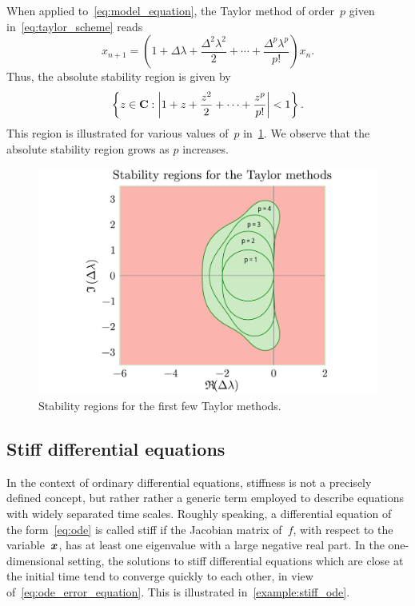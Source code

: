 \begin{example}
    When applied to~\eqref{eq:model_equation},
    the Taylor method of order~$p$ given in~\eqref{eq:taylor_scheme} reads
    \[
        x_{n+1} = \left(1 + \Delta \lambda + \frac{\Delta^2 \lambda^2}{2} + \dotsb + \frac{\Delta^p \lambda^p}{p!} \right) x_n.
    \]
    Thus, the absolute stability region is given by
    \[
        \left\{ z \in \mathbf C : \left\lvert 1 + z + \frac{z^2}{2} + \dotsb + \frac{z^p}{p!} \right\rvert < 1 \right\}.
    \]
    This region is illustrated for various values of~$p$ in~\cref{fig:stab_taylor}.
    We observe that the absolute stability region grows as $p$ increases.
\end{example}

\begin{figure}[ht]
    \centering
    \includegraphics[width=0.70\linewidth]{figures/stability_Taylor_methods.pdf}
    \caption{Stability regions for the first few Taylor methods.}%
    \label{fig:stab_taylor}
\end{figure}

\subsection*{Stiff differential equations}
In the context of ordinary differential equations,
stiffness is not a precisely defined concept,
but rather rather a generic term employed to describe equations with widely separated time scales.
Roughly speaking, a differential equation of the form~\eqref{eq:ode} is called stiff if the Jacobian matrix of~$f$,
with respect to the variable~$\mathbf{\boldsymbol{x}}$,
has at least one eigenvalue with a large negative real part.
In the one-dimensional setting,
the solutions to stiff differential equations which are close at the initial time tend to converge quickly to each other,
in view of~\eqref{eq:ode_error_equation}.
This is illustrated in~\cref{example:stiff_ode}.

